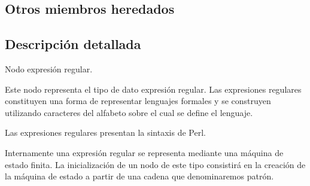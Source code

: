 \subsection*{Otros miembros heredados}


\subsection{Descripción detallada}
Nodo expresión regular. 

Este nodo representa el tipo de dato expresión regular. Las expresiones regulares constituyen una forma de representar lenguajes formales y se construyen utilizando caracteres del alfabeto sobre el cual se define el lenguaje.

Las expresiones regulares presentan la sintaxis de Perl.

Internamente una expresión regular se representa mediante una máquina de estado finita. La inicialización de un nodo de este tipo consistirá en la creación de la máquina de estado a partir de una cadena que denominaremos patrón. 

